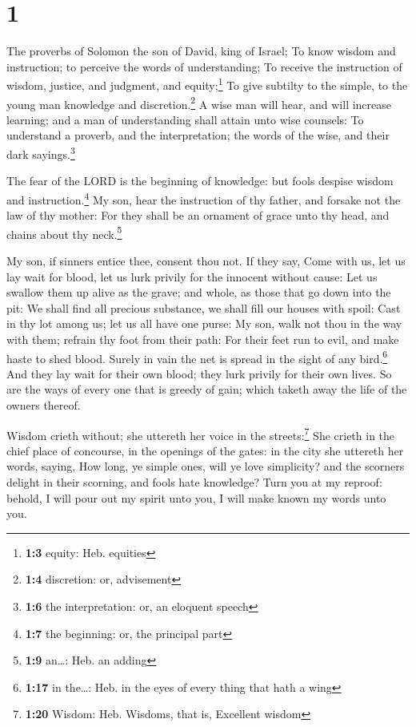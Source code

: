 \hypertarget{section}{%
\section{1}\label{section}}

 The proverbs of Solomon the son of David, king of Israel;
 To know wisdom and instruction; to perceive the words of
understanding;  To receive the instruction of wisdom,
justice, and judgment, and equity;\footnote{\textbf{1:3} equity: Heb.
  equities}  To give subtilty to the simple, to the young
man knowledge and discretion.\footnote{\textbf{1:4} discretion: or,
  advisement}  A wise man will hear, and will increase
learning; and a man of understanding shall attain unto wise counsels:
 To understand a proverb, and the interpretation; the
words of the wise, and their dark sayings.\footnote{\textbf{1:6} the
  interpretation: or, an eloquent speech}

 The fear of the LORD is the beginning of knowledge: but
fools despise wisdom and instruction.\footnote{\textbf{1:7} the
  beginning: or, the principal part}  My son, hear the
instruction of thy father, and forsake not the law of thy mother:
 For they shall be an ornament of grace unto thy head, and
chains about thy neck.\footnote{\textbf{1:9} an\ldots: Heb. an adding}

 My son, if sinners entice thee, consent thou not.
 If they say, Come with us, let us lay wait for blood,
let us lurk privily for the innocent without cause:  Let
us swallow them up alive as the grave; and whole, as those that go down
into the pit:  We shall find all precious substance, we
shall fill our houses with spoil:  Cast in thy lot among
us; let us all have one purse:  My son, walk not thou in
the way with them; refrain thy foot from their path:  For
their feet run to evil, and make haste to shed blood. 
Surely in vain the net is spread in the sight of any bird.\footnote{\textbf{1:17}
  in the\ldots: Heb. in the eyes of every thing that hath a wing}
 And they lay wait for their own blood; they lurk privily
for their own lives.  So are the ways of every one that
is greedy of gain; which taketh away the life of the owners thereof.

 Wisdom crieth without; she uttereth her voice in the
streets:\footnote{\textbf{1:20} Wisdom: Heb. Wisdoms, that is, Excellent
  wisdom}  She crieth in the chief place of concourse, in
the openings of the gates: in the city she uttereth her words, saying,
 How long, ye simple ones, will ye love simplicity? and
the scorners delight in their scorning, and fools hate knowledge?
 Turn you at my reproof: behold, I will pour out my
spirit unto you, I will make known my words unto you.

